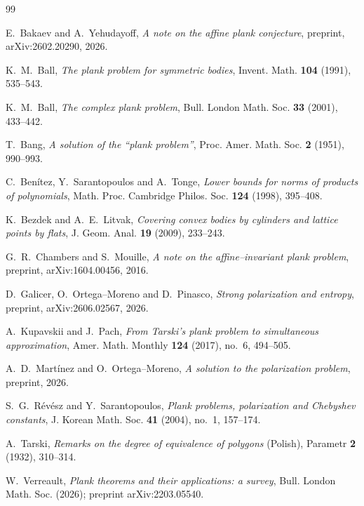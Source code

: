 \documentclass[11pt,reqno]{amsart}
\theoremstyle{plain}
\theoremstyle{definition}
\begin{document}
\begin{thebibliography}{99}

E.~Bakaev and A.~Yehudayoff,
\emph{A note on the affine plank conjecture},
preprint, arXiv:2602.20290, 2026.

K.~M.~Ball,
\emph{The plank problem for symmetric bodies},
Invent. Math. \textbf{104} (1991), 535--543.

K.~M.~Ball,
\emph{The complex plank problem},
Bull. London Math. Soc. \textbf{33} (2001), 433--442.

T.~Bang,
\emph{A solution of the ``plank problem''},
Proc. Amer. Math. Soc. \textbf{2} (1951), 990--993.

C.~Ben\'itez, Y.~Sarantopoulos and A.~Tonge,
\emph{Lower bounds for norms of products of polynomials},
Math. Proc. Cambridge Philos. Soc. \textbf{124} (1998), 395--408.

K.~Bezdek and A.~E.~Litvak,
\emph{Covering convex bodies by cylinders and lattice points by flats},
J. Geom. Anal. \textbf{19} (2009), 233--243.

G.~R.~Chambers and S.~Mouille,
\emph{A note on the affine--invariant plank problem},
preprint, arXiv:1604.00456, 2016.

D.~Galicer, O.~Ortega--Moreno and D.~Pinasco,
\emph{Strong polarization and entropy},
preprint, arXiv:2606.02567, 2026.

A.~Kupavskii and J.~Pach,
\emph{From Tarski's plank problem to simultaneous approximation},
Amer. Math. Monthly \textbf{124} (2017), no.~6, 494--505.

A.~D.~Mart\'inez and O.~Ortega--Moreno,
\emph{A solution to the polarization problem},
preprint, 2026.

S.~G.~R\'ev\'esz and Y.~Sarantopoulos,
\emph{Plank problems, polarization and Chebyshev constants},
J. Korean Math. Soc. \textbf{41} (2004), no.~1, 157--174.

A.~Tarski,
\emph{Remarks on the degree of equivalence of polygons} (Polish),
Parametr \textbf{2} (1932), 310--314.

W.~Verreault,
\emph{Plank theorems and their applications: a survey},
Bull. London Math. Soc. (2026); preprint arXiv:2203.05540.

\end{thebibliography}
\end{document}

